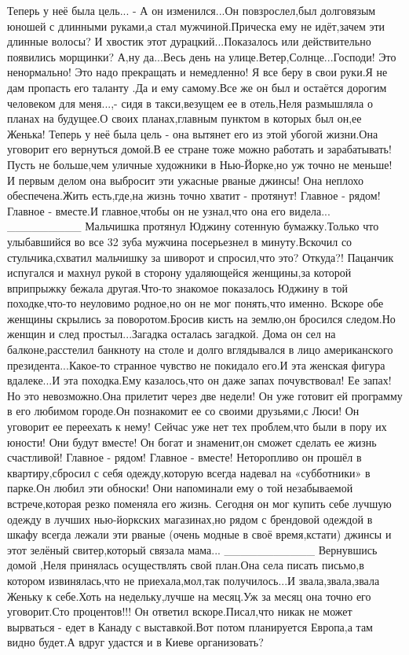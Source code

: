 Теперь у неё была цель...
- А он изменился...Он повзрослел,был долговязым юношей с длинными руками,а стал мужчиной.Прическа ему не идёт,зачем эти длинные волосы? И хвостик этот дурацкий...Показалось или действительно появились морщинки? А,ну да...Весь день на улице.Ветер,Солнце...Господи! Это ненормально! Это надо прекращать и немедленно! Я все беру в свои руки.Я не дам пропасть его таланту .Да и ему самому.Все же он был и остаётся дорогим человеком для меня...,- сидя в такси,везущем ее в отель,Неля размышляла о планах на будущее.О своих планах,главным пунктом в которых был он,ее Женька! 
Теперь у неё была цель - она вытянет его из этой убогой жизни.Она уговорит его вернуться домой.В ее стране тоже можно работать и зарабатывать! Пусть не больше,чем уличные художники в Нью-Йорке,но уж точно не меньше! И первым делом она выбросит эти ужасные рваные джинсы! Она неплохо обеспечена.Жить есть,где,на жизнь точно хватит - протянут! Главное - рядом! Главное - вместе.И главное,чтобы он не узнал,что она его видела...
_________
Мальчишка протянул Юджину сотенную бумажку.Только что улыбавшийся во все 32 зуба мужчина посерьезнел в минуту.Вскочил со стульчика,схватил мальчишку за шиворот и спросил,что это? Откуда?! 
Пацанчик испугался и махнул рукой в сторону удаляющейся женщины,за которой вприпрыжку бежала другая.Что-то знакомое показалось Юджину в той походке,что-то неуловимо родное,но он не мог понять,что именно.
Вскоре обе женщины скрылись за поворотом.Бросив кисть на землю,он бросился следом.Но женщин и след простыл...Загадка осталась загадкой.
Дома он сел на балконе,расстелил банкноту на столе и долго вглядывался в лицо американского президента...Какое-то странное чувство не покидало его.И эта женская фигура вдалеке...И эта походка.Ему казалось,что он даже запах почувствовал! Ее запах! Но это невозможно.Она прилетит через две недели! Он уже готовит ей программу в его любимом городе.Он познакомит ее со своими друзьями,с Люси! Он уговорит ее переехать к нему! Сейчас уже нет тех проблем,что были в пору их юности! Они будут вместе! Он богат и знаменит,он сможет сделать ее жизнь счастливой! Главное - рядом! Главное - вместе! 
Неторопливо он прошёл в квартиру,сбросил с себя одежду,которую всегда надевал на «субботники» в парке.Он любил эти обноски! Они напоминали ему о той незабываемой встрече,которая резко поменяла его жизнь.
Сегодня он мог купить себе лучшую одежду в лучших нью-йоркских магазинах,но рядом с брендовой одеждой в шкафу всегда лежали эти рваные (очень модные в своё время,кстати) джинсы и этот зелёный свитер,который связала мама...
___________
Вернувшись домой ,Неля принялась осуществлять свой план.Она села писать письмо,в котором извинялась,что не приехала,мол,так получилось...И звала,звала,звала Женьку к себе.Хоть на недельку,лучше на месяц.Уж за месяц она точно его уговорит.Сто процентов!!! Он ответил вскоре.Писал,что никак не может вырваться - едет в Канаду с выставкой.Вот потом планируется Европа,а там видно будет.А вдруг удастся и в Киеве организовать? 
